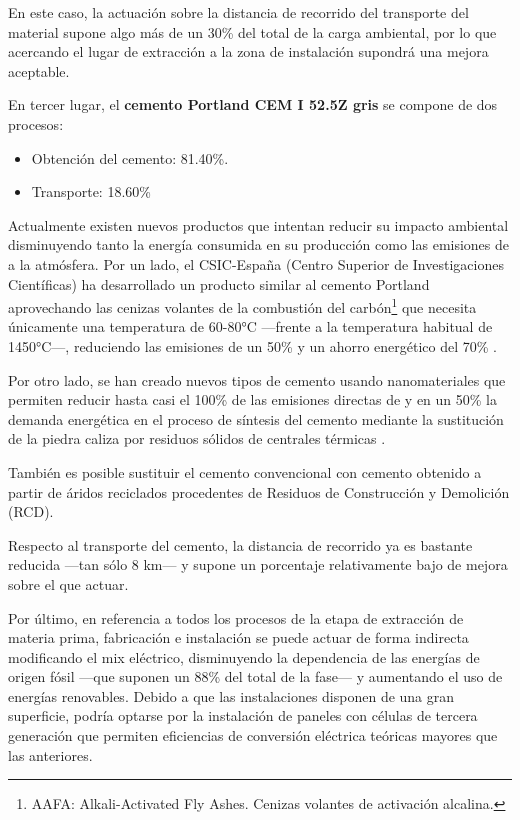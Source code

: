 En este caso, la actuación sobre la distancia de recorrido del transporte del material supone algo más de un 30\% del total de la carga ambiental, por lo que acercando el lugar de extracción a la zona de instalación supondrá una mejora aceptable.

En tercer lugar, el \textbf{cemento Portland CEM I 52.5Z gris} se compone de dos procesos:
\begin{itemize}
  \item Obtención del cemento: 81.40\%.
  \item Transporte: 18.60\%
\end{itemize}

Actualmente existen nuevos productos que intentan reducir su impacto ambiental disminuyendo tanto la energía consumida en su producción como las emisiones de  a la atmósfera. Por un lado, el CSIC-España (Centro Superior de Investigaciones Científicas) ha desarrollado un producto similar al cemento Portland aprovechando las cenizas volantes de la combustión del carbón\footnote{AAFA: Alkali-Activated Fly Ashes. Cenizas volantes de activación alcalina.} que necesita únicamente una temperatura de 60-80\si{\celsius} —frente a la temperatura habitual de 1450\si{\celsius}—, reduciendo las emisiones de  un 50\% y un ahorro energético del 70\% \cite{csic}.

Por otro lado, se han creado nuevos tipos de cemento usando nanomateriales que permiten reducir hasta casi el 100\% de las emisiones directas de  y en un 50\% la demanda energética en el proceso de síntesis del cemento mediante la sustitución de la piedra caliza por residuos sólidos de centrales térmicas \cite{website:tecnalia}.

También es posible sustituir el cemento convencional con cemento obtenido a partir de áridos reciclados procedentes de Residuos de Construcción y Demolición (RCD).

Respecto al transporte del cemento, la distancia de recorrido ya es bastante reducida —tan sólo 8 \si{km}— y supone un porcentaje relativamente bajo de mejora sobre el que actuar.

Por último, en referencia a todos los procesos de la etapa de extracción de materia prima, fabricación e instalación se puede actuar de forma indirecta modificando el mix eléctrico, disminuyendo la dependencia de las energías de origen fósil —que suponen un 88\% del total de la fase— y aumentando el uso de energías renovables. Debido a que las instalaciones disponen de una gran superficie, podría optarse por la instalación de paneles con células de tercera generación que permiten eficiencias de conversión eléctrica teóricas mayores que las anteriores.

